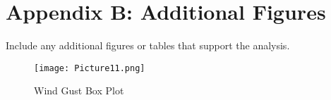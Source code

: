 \documentclass[a4paper, 12pt]{article}
\begin{document}
\section{Appendix B: Additional Figures}
\label{sec:appendix-b}
Include any additional figures or tables that support the analysis.

\begin{figure}[H]
\centering
\texttt{[image: Picture11.png]}
\caption{Wind Gust Box Plot}
\label{fig:wind-gust-box-plot}
\end{figure}
\end{document}
